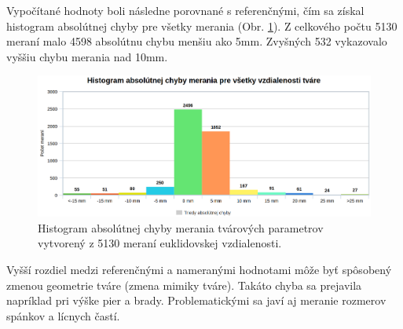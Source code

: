 Vypočítané hodnoty boli následne porovnané s referenčnými, čím sa získal histogram absolútnej chyby pre všetky merania (Obr. \ref{fig:histogram}). Z celkového počtu 5130 meraní malo 4598 absolútnu chybu menšiu ako 5mm. Zvyšných 532 vykazovalo vyššiu chybu merania nad 10mm. 

\begin{figure}[H]
	\centering
	\includegraphics[width=\textwidth]{figures/plot.png}
	\caption{Histogram absolútnej chyby merania tvárových parametrov vytvorený z 5130 meraní euklidovskej vzdialenosti.}
	\label{fig:histogram}
\end{figure}

Vyšší rozdiel medzi referenčnými a nameranými hodnotami môže byť spôsobený zmenou geometrie tváre (zmena mimiky tváre). Takáto chyba sa prejavila napríklad pri výške pier a brady. Problematickými sa javí aj meranie rozmerov spánkov a lícnych častí. 

